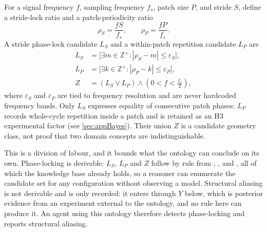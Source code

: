 For a signal frequency $f$, sampling frequency $f_s$, patch size $P$, and stride $S$, define a stride-lock ratio and a patch-periodicity ratio
\begin{equation*}
\rho_S=\frac{fS}{f_s},
\qquad
\rho_P=\frac{fP}{f_s}.
\end{equation*}
A stride phase-lock candidate $L_S$ and a within-patch repetition candidate $L_P$ are
\begin{equation}
\begin{aligned}
L_S&=\big[\exists m\in\mathbb{Z}^{+}:|\rho_S-m|\leq\varepsilon_S\big],\\
L_P&=\big[\exists k\in\mathbb{Z}^{+}:|\rho_P-k|\leq\varepsilon_P\big],\\
Z&=(L_S\vee L_P)\wedge\left(0<f<\frac{f_s}{2}\right),
\end{aligned}
\label{eq:locking-candidate}
\end{equation}
where $\varepsilon_S$ and $\varepsilon_P$ are tied to frequency resolution and are never hardcoded frequency bands. Only $L_S$ expresses equality of consecutive patch phases; $L_P$ records whole-cycle repetition inside a patch and is retained as an H3 experimental factor (see \autoref{sec:appBayes}). Their union $Z$ is a candidate geometry class, not proof that two domain concepts are indistinguishable.

This is a division of labour, and it bounds what the ontology can conclude on its own. Phase-locking is derivable: $L_S$, $L_P$ and $Z$ follow by rule from , ,  and , all of which the knowledge base already holds, so a reasoner can enumerate the candidate set for any configuration without observing a model. Structural aliasing is not derivable and is only recorded: it enters through $Y$ below, which is posterior evidence from an experiment external to the ontology, and no rule here can produce it. An agent using this ontology therefore detects phase-locking and reports structural aliasing.

